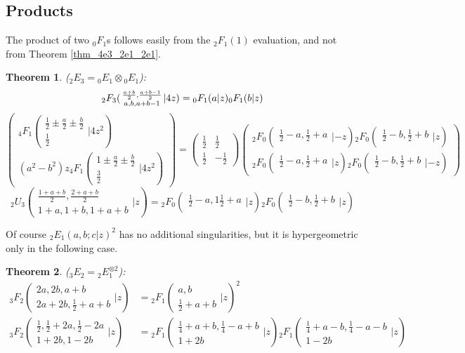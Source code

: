 \documentclass[12pt]{article}
\numberwithin{equation}{section}
\newtheorem{theorem}{Theorem}[section]
\newcommand{\Head}[3] {{}_{#1}{#2}_{#3}}
\newcommand{\ArgS}[3] {( \begin{smallmatrix} #1 \\ #2 \end{smallmatrix} | {#3})}
\begin{document}
\subsection{Products}
The product of two $\Head{0}{F}{1}$s follows easily from the $\Head{2}{F}{1}(1)$ evaluation, and not from Theorem \ref{thm_4e3_2e1_2e1}.
\begin{theorem}
\label{thm_0f1_prod}
($\Head{2}{E}{3} = \Head{0}{E}{1} \otimes \Head{0}{E}{1}$):
\begin{equation*}
\Head{2}{F}{3} \ArgS{\frac{a+b}{2},\frac{a+b-1}{2}}{a,b,a+b-1}{4z} = \Head{0}{F}{1}(a|z)\Head{0}{F}{1}(b|z)\\
\end{equation*}
\begin{equation*}
\left(\begin{array}{r}
\Head{4}{F}{1} \ArgS{\frac12 \pm \frac{a}{2} \pm \frac{b}{2}} {\frac12} {4 z^2}\\
(a^2 - b^2) z \Head{4}{F}{1} \ArgS{1 \pm \frac{a}{2} \pm \frac{b}{2}} {\frac32} {4 z^2}
\end{array}\right)
 =
\begin{pmatrix}
\frac12 & \frac12 \\
\frac12 & -\frac12
\end{pmatrix}
\begin{pmatrix}
\Head{2}{F}{0}\ArgS{\frac12 - a, \frac12 + a}{}{-z} \Head{2}{F}{0} \ArgS{\frac12 - b, \frac12 + b}{}{z}\\
\Head{2}{F}{0} \ArgS{\frac12 - a, \frac12 + a} {}{z} \Head{2}{F}{0} \ArgS{\frac12 - b, \frac12+ b} {}{-z}
\end{pmatrix}
\end{equation*}
\begin{equation*}
\Head{2}{U}{3} \ArgS{\frac{1+a+b}2,\frac{2+a+b}2}{1+a,1+b,1+a+b}{z} = \Head{2}{F}{0} \ArgS{\frac12 - a, 1\frac12+a}{}{z} \Head{2}{F}{0} \ArgS{\frac12-b, \frac12+b} {}{z}
\end{equation*}
\end{theorem}
Of course $\Head{2}{E}{1}(a,b;c|z)^2$ has no additional singularities, but it is hypergeometric only in the following case.
\begin{theorem}
($\Head{3}{E}{2} = \Head{2}{E}{1}^{\otimes 2}$):
\begin{align*}
\Head{3}{F}{2} \ArgS{2a,2b,a+b}{2a+2b,\frac12+a+b}{z} &= \Head{2}{F}{1} \ArgS{a,b}{\frac12+a+b}{z}^2\\
\Head{3}{F}{2} \ArgS{\frac12,\frac12 + 2a,\frac12-2a}{1+2b,1-2b}{z} &= \Head{2}{F}{1} \ArgS{\frac14+a+b,\frac14-a+b}{1+2b}{z} \Head{2}{F}{1} \ArgS{\frac14+a-b,\frac14-a-b}{1-2b}{z}
\end{align*}
\end{theorem}
\end{document}
